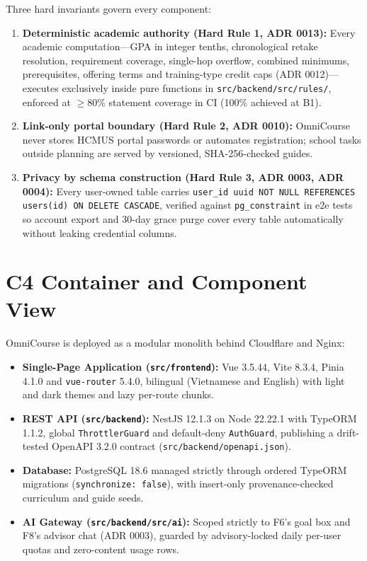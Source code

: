 \documentclass{article}
\begin{document}
Three hard invariants govern every component:
\begin{enumerate}
  \item \textbf{Deterministic academic authority (Hard Rule 1, ADR 0013):} Every academic computation---GPA in integer tenths,
        chronological retake resolution, requirement coverage, single-hop overflow, combined minimums, prerequisites, offering
        terms and training-type credit caps (ADR 0012)---executes exclusively inside pure functions in
        \texttt{src/backend/src/rules/}, enforced at $\ge 80\%$ statement coverage in CI (100\% achieved at B1).
  \item \textbf{Link-only portal boundary (Hard Rule 2, ADR 0010):} OmniCourse never stores HCMUS portal passwords or
        automates registration; school tasks outside planning are served by versioned, SHA-256-checked guides.
  \item \textbf{Privacy by schema construction (Hard Rule 3, ADR 0003, ADR 0004):} Every user-owned table carries
        \texttt{user\_id uuid NOT NULL REFERENCES users(id) ON DELETE CASCADE}, verified against \texttt{pg\_constraint} in e2e
        tests so account export and 30-day grace purge cover every table automatically without leaking credential columns.
\end{enumerate}

\section{C4 Container and Component View}
OmniCourse is deployed as a modular monolith behind Cloudflare and Nginx:
\begin{itemize}
  \item \textbf{Single-Page Application (\texttt{src/frontend}):} Vue 3.5.44, Vite 8.3.4, Pinia 4.1.0 and \texttt{vue-router}
        5.4.0, bilingual (Vietnamese and English) with light and dark themes and lazy per-route chunks.
  \item \textbf{REST API (\texttt{src/backend}):} NestJS 12.1.3 on Node 22.22.1 with TypeORM 1.1.2, global
        \texttt{ThrottlerGuard} and default-deny \texttt{AuthGuard}, publishing a drift-tested OpenAPI 3.2.0 contract
        (\texttt{src/backend/openapi.json}).
  \item \textbf{Database:} PostgreSQL 18.6 managed strictly through ordered TypeORM migrations (\texttt{synchronize: false}),
        with insert-only provenance-checked curriculum and guide seeds.
  \item \textbf{AI Gateway (\texttt{src/backend/src/ai}):} Scoped strictly to F6's goal box and F8's advisor chat (ADR 0003),
        guarded by advisory-locked daily per-user quotas and zero-content usage rows.
\end{itemize}
\end{document}
